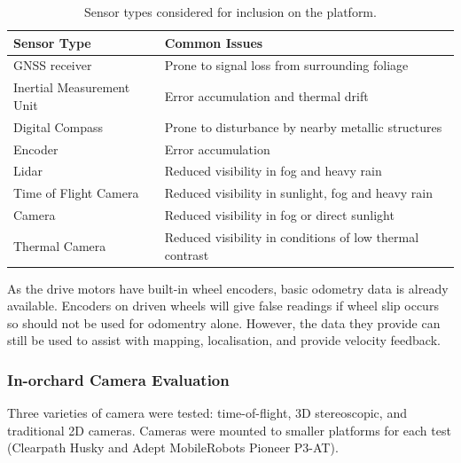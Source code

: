 \documentclass[preprint,authoryear,12pt]{elsarticle}
\begin{document}
    \begin{table}[htbp]
        \centering
        \footnotesize
        \begin{tabular}{ l l}

            \textbf{Sensor Type}      &\textbf{Common Issues} \\ \hline
            GNSS receiver              & Prone to signal loss from surrounding foliage\\  \hline
            Inertial Measurement Unit & Error accumulation and thermal drift\\ \hline
            Digital Compass           & Prone to disturbance by nearby metallic structures\\ \hline
            Encoder                   & Error accumulation \\ \hline
            Lidar                     & Reduced visibility in fog and heavy rain \\ \hline
            Time of Flight Camera     & Reduced visibility in sunlight, fog and heavy rain \\ \hline
            Camera                    & Reduced visibility in fog or direct sunlight \\ \hline
            Thermal Camera            & Reduced visibility in conditions of low thermal contrast\\ \hline
        \end{tabular}
        \caption{Sensor types considered for inclusion on the platform.}
        \label{table:sensor_comparison}
    \end{table}

    As the drive motors have built-in wheel encoders, basic odometry data is already available.
    Encoders on driven wheels will give false readings if wheel slip occurs so should not be used for odomentry alone.
    However, the data they provide can still be used to assist with mapping, localisation, and provide velocity feedback.


    \subsubsection{In-orchard Camera Evaluation}
        \label{sect:camera_evaluation}

        Three varieties of camera were tested: time-of-flight, 3D stereoscopic, and traditional 2D cameras.
        Cameras were mounted to smaller platforms for each test (Clearpath Husky and Adept MobileRobots Pioneer P3-AT).
\end{document}
